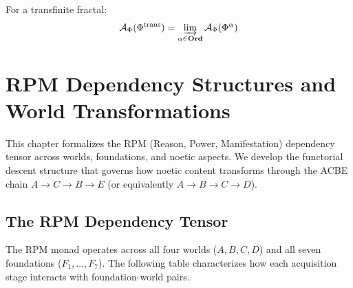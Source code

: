 \begin{corollary}
\label{cor:transfinite-attractor}
For a transfinite fractal:
\[
    \mathcal{A}_\Phi(\Phi^{\mathrm{trans}}) = \varinjlim_{\alpha \in \mathbf{Ord}}
    \mathcal{A}_\Phi(\Phi^{\alpha})
\]
\end{corollary}


\chapter{RPM Dependency Structures and World Transformations}
\label{ch:rpm-dependencies}

\begin{tcolorbox}[colback=blue!5!white,colframe=blue!75!black,title=\vnewfour,breakable]
This chapter formalizes the RPM (Reason, Power, Manifestation) dependency tensor
across worlds, foundations, and noetic aspects. We develop the functorial descent
structure that governs how noetic content transforms through the ACBE chain
$A \to C \to B \to E$ (or equivalently $A \to B \to C \to D$).
\end{tcolorbox}

\section{The RPM Dependency Tensor}

The RPM monad operates across all four worlds ($A, B, C, D$) and all seven
foundations ($F_1, \ldots, F_7$). The following table characterizes how each
acquisition stage interacts with foundation-world pairs.

